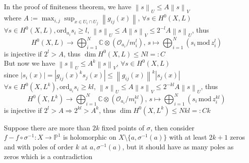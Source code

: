 \documentclass[../main.tex]{subfiles}
\begin{document}
\begin{problem}
In the proof of finiteness theorem, we have $\left \| s \right \|_U\leq A\left \| s \right \|_V$ \\
where $A:=\displaystyle\max_{i,j}\sup_{x\in U_i\cap U_j}\left \| g_{ij}(x) \right \|$, $\forall s\in H^0(X,L)$ \\
$\forall s\in H^0(X,L), \mathrm{ord}_{a_i}s_i\geq l$, $\left \| s \right \|_U\leq A\left \| s \right \|_V\leq 2^{-l}A\left \| s \right \|_U$, thus $$H^0(X,L)\rightarrow \displaystyle\bigoplus_{i=1}^{N}\mathbb{C}\otimes\left(\mathcal{O}_{a_i}/m_i^{l}\right),\,s\mapsto\displaystyle\bigoplus_{i=1}^{N}\left(s_i\,\mathrm{mod}\,z_i^l\right)$$
is injective if $2^l>A$, thus $\dim H^0(X,L)\leq Nl=:C$ \\
But now we have $\left \| s \right \|_U\leq A^k\left \| s \right \|_V$, $\forall s\in H^0(X,L)$ \\
since $|s_i(x)|=|g_{ij}(x)^ks_j(x)|\leq \left \| g_{ij}(x) \right \|^k|s_j(x)|$ \\
$\forall s\in H^0(X,L^k), \mathrm{ord}_{a_i}s_i\geq kl$, $\left \| s \right \|_U\leq A\left \| s \right \|_V\leq 2^{-kl}A\left \| s \right \|_U$, thus $$H^0(X,L^k)\rightarrow \displaystyle\bigoplus_{i=1}^{N}\mathbb{C}\otimes\left(\mathcal{O}_{a_i}/m_i^{kl}\right),\,s\mapsto\displaystyle\bigoplus_{i=1}^{N}\left(s_i\,\mathrm{mod}\,z_i^{kl}\right)$$
is injective if $2^l>A\Rightarrow 2^{kl}>A^k$, thus $\dim H^0(X,L^k)\leq Nkl=:Ck$
\end{problem}

\begin{problem}
Suppose there are more than $2k$ fixed points of $\sigma$, then consider $f-f\circ\sigma^{-1}: X\rightarrow\mathbb{P}^1$ is holomorphic on $X\setminus\{a,\sigma^{-1}(a)\}$ with at least $2k+1$ zeros and with poles of order $k$ at $a, \sigma^{-1}(a)$, but it should have as many poles as zeros which is a contradiction
\end{problem}
\end{document}

